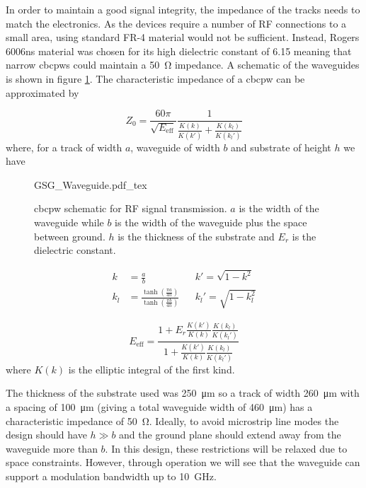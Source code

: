 In order to maintain a good signal integrity, the impedance of the tracks needs to match the electronics. As the devices require a number of RF connections to a small area, using standard FR-4 material would not be sufficient. Instead, Rogers 6006ns material was chosen for its high dielectric constant of \num{6.15} meaning that narrow \acp{cbcpw} could maintain a \SI{50}{\ohm} impedance. A schematic of the waveguides is shown in figure \ref{fig:GSG_waveguide}. The characteristic impedance of a \ac{cbcpw} can be approximated by \cite{wadell1991}

\begin{equation}
	Z_0 = \frac{60\pi}{\sqrt{E_\text{eff}}}\frac{1}{\frac{K(k)}{K(k')} + \frac{K(k_l)}{K(k_l')}}
\end{equation}
where, for a track of width $a$, waveguide of width $b$ and substrate of height $h$ we have

\begin{figure}[t]
	\centering
	\Large
	\def\svgwidth{0.6\textwidth} 
	{GSG_Waveguide.pdf_tex}
	\caption[Conductor-backed coplanar waveguide structure]{\ac{cbcpw} schematic for RF signal transmission. $a$ is the width of the waveguide while $b$ is the width of the waveguide plus the space between ground. $h$ is the thickness of the substrate and $E_r$ is the dielectric constant.}
	\label{fig:GSG_waveguide}
\end{figure}

\begin{align}
	k &= \frac{a}{b} &&k' = \sqrt{1 - k^2}\\
	k_l &= \frac{\tanh\left(\frac{\pi a}{4 h}\right)}{\tanh\left(\frac{\pi b}{4 h}\right)} &&k_l' = \sqrt{1 - k_l^2}
\end{align}

\begin{equation}
	E_\text{eff} = \frac{1 + E_r \frac{K(k')}{K(k)} \frac{K(k_l)}{K(k_l')}}{1 + \frac{K(k')}{K(k)} \frac{K(k_l)}{K(k_l')}}
\end{equation}
where $K(k)$ is the elliptic integral of the first kind. 

The thickness of the substrate used was \SI{250}{\um} so a track of width \SI{260}{\um} with a spacing of \SI{100}{\um} (giving a total waveguide width of \SI{460}{\um}) has a characteristic impedance of \SI{50}{\ohm}. Ideally, to avoid microstrip line modes the design should have $h \gg b$ and the ground plane should extend away from the waveguide more than $b$\cite{riaziat1987}. In this design, these restrictions will be relaxed due to space constraints. However, through operation we will see that the waveguide can support a modulation bandwidth up to \SI{10}{GHz}.

